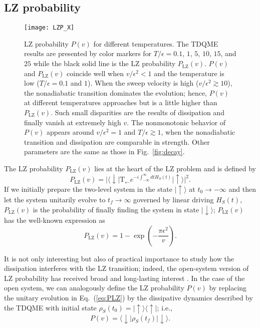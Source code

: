 \documentclass[english,nofootinbib, pra, twocolumn,superscriptaddress]{revtex4-1}
\begin{document}
\subsection{LZ probability}

\begin{figure}[h]
\texttt{[image: LZP\_X]}\caption{LZ probability $P(v)$ for different temperatures. The TDQME results
are presented by color markers for $T/\epsilon=0.1$, $1$, $5$,
$10$, $15$, and $25$ while the black solid line is the LZ probability
$P_{\text{LZ}}(v)$. $P(v)$ and $P_{\text{LZ}}(v)$
coincide well when $v/\epsilon^{2}<1$ and the temperature is low
($T/\epsilon=0.1$ and $1$). When the sweep velocity is high ($v/\epsilon^{2}\apprge10$),
the nonadiabatic transition dominates the evolution; hence, $P(v)$
at different temperatures approaches but is a little higher
than $P_{\text{LZ}}(v)$. Such small disparities are the results of dissipation and finally vanish at extremely high
$v$. The nonmonotonic behavior of $P(v)$ appears around $v/\epsilon^{2}=1$
and $T/\epsilon\apprge1$, when the nonadiabatic transition and dissipation
are comparable in strength. Other parameters are the same as those in Fig.~\ref{fig:decay}.}
\label{fig:LZP}
\end{figure}

The LZ probability $P_{\text{LZ}}(v)$ lies at the heart of the LZ
problem and is defined by 
\begin{equation}
P_{\text{LZ}}(v)=\vert\langle\downarrow\vert\mbox{T}_{\leftarrow}e^{-i\int_{-\infty}^{\infty}dtH_{S}(t)}\vert\uparrow\rangle\vert^{2}.\label{eq:PLZ}
\end{equation}
If we initially prepare the two-level system in the state $\vert\uparrow\rangle$
at $t_{0}\rightarrow-\infty$ and then let the system unitarily evolve
to $t_{f}\rightarrow\infty$ governed by linear driving $H_{S}(t)$,
$P_{\text{LZ}}(v)$ is the probability of finally finding the system
in state $\vert\downarrow\rangle$; $P_{\text{LZ}}(v)$ has the well-known expression
\citep{1932.Zener,1932.Landau} as
\begin{equation}
P_{\text{LZ}}(v)=1-\exp\left(-\frac{\pi\epsilon^{2}}{v}\right).\label{eq:PLZ2}
\end{equation}

It is not only interesting but also of practical importance to study
how the dissipation interferes with the LZ transition; indeed, the open-system
version of LZ probability has received broad and long-lasting interest
\citep{1988.Wilkinson,1991.Rammer,1997.Nakayama,2007.Hanggi,2009.Thorwart,2014.Segal,2015.Thorwart,2020.Chen}.
In the case of the open system, we can analogously define the LZ probability $P(v)$
by replacing the unitary evolution in Eq.~(\ref{eq:PLZ}) by the
dissipative dynamics described by the TDQME with initial state $\rho_{S}(t_{0})=\vert\uparrow\rangle\langle\uparrow\vert$; i.e.,
\begin{equation}
P(v)=\langle\downarrow\vert\rho_{S}(t_{f})\vert\downarrow\rangle.\label{eq:Pv}
\end{equation}
\end{document}

